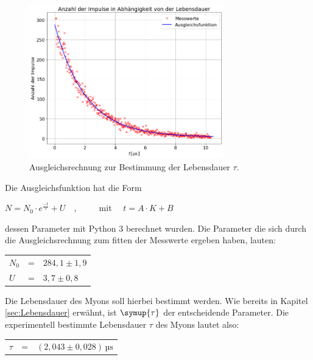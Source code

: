 \begin{figure}[H]
 \centering
 \includegraphics[width=0.75\textwidth]{plot3.png}
 \caption{Ausgleichsrechnung zur Bestimmung der Lebensdauer $\tau$.}
 \label{fig:plot3}
\end{figure}

\noindent Die Ausgleichsfunktion hat die Form

\begin{center}
$N = N_0\cdot e^{\frac{-t}{\tau}} + U\quad$, $\qquad$ mit $\quad t = A \cdot K+B$
\end{center}

\noindent dessen Parameter mit Python 3 berechnet wurden. Die Parameter die sich durch die Ausgleichsrechnung zum fitten der Messwerte ergeben haben, lauten:

\begin{table}[H]
\centering
\begin{tabular}{lll}
$N_0$   &=& $284,1\pm1,9  $ \\
$U$     &=& $  3,7\pm0,8  $ \\
\end{tabular}
\end{table}

\noindent Die Lebensdauer des Myons soll hierbei bestimmt werden. Wie bereits in Kapitel \ref{sec:Lebensdauer} erwähnt, ist $\symup{\tau}$ der entscheidende Parameter. Die experimentell bestimmte Lebensdauer $\tau$ des Myons lautet also:

\begin{table}[H]
\centering
\begin{tabular}{lll}
$\tau$  &=& $(2,043\pm0,028)\,\mathrm{µs}$ \\
\end{tabular}
\end{table}
